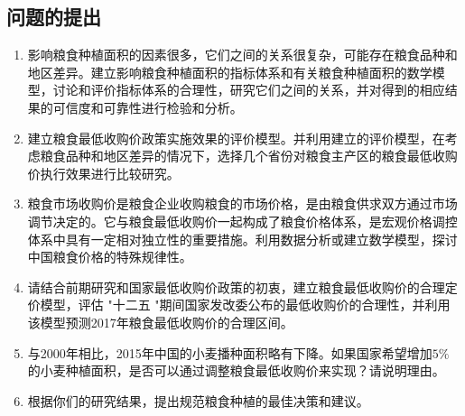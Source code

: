 \documentclass[withoutpreface,bwprint]{cumcmthesis} %
\begin{document}
	
	
	
	\subsection{问题的提出}
\begin{enumerate}[itemsep=0pt,parsep=0pt,label=(\arabic*)]
\item 影响粮食种植面积的因素很多，它们之间的关系很复杂，可能存在粮食品种和地区差异。建立影响粮食种植面积的指标体系和有关粮食种植面积的数学模型，讨论和评价指标体系的合理性，研究它们之间的关系，并对得到的相应结果的可信度和可靠性进行检验和分析。
\item 建立粮食最低收购价政策实施效果的评价模型。并利用建立的评价模型，在考虑粮食品种和地区差异的情况下，选择几个省份对粮食主产区的粮食最低收购价执行效果进行比较研究。
\item 粮食市场收购价是粮食企业收购粮食的市场价格，是由粮食供求双方通过市场调节决定的。它与粮食最低收购价一起构成了粮食价格体系，是宏观价格调控体系中具有一定相对独立性的重要措施。利用数据分析或建立数学模型，探讨中国粮食价格的特殊规律性。
\item 请结合前期研究和国家最低收购价政策的初衷，建立粮食最低收购价的合理定价模型，评估 "十二五 "期间国家发改委公布的最低收购价的合理性，并利用该模型预测2017年粮食最低收购价的合理区间。
\item 与2000年相比，2015年中国的小麦播种面积略有下降。如果国家希望增加$5\%$的小麦种植面积，是否可以通过调整粮食最低收购价来实现？请说明理由。
\item 根据你们的研究结果，提出规范粮食种植的最佳决策和建议。
\end{enumerate}
\end{document}
